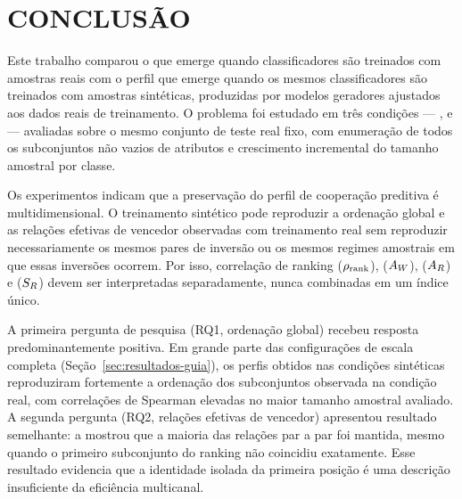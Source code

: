\chapter{CONCLUSÃO}
\label{chap:conclusao}

Este trabalho comparou o \PredictiveCooperationProfile{} que emerge quando classificadores são treinados com amostras reais com o perfil que emerge quando os mesmos classificadores são treinados com amostras sintéticas, produzidas por modelos geradores ajustados aos dados reais de treinamento. O problema foi estudado em três condições --- \RealToReal{}, \GaussianToReal{} e \GMMToReal{} --- avaliadas sobre o mesmo conjunto de teste real fixo, com enumeração de todos os subconjuntos não vazios de atributos e crescimento incremental do tamanho amostral por classe.

\begin{keyresultbox}
Os experimentos indicam que a preservação do perfil de cooperação preditiva é multidimensional. O treinamento sintético pode reproduzir a ordenação global e as relações efetivas de vencedor observadas com treinamento real sem reproduzir necessariamente os mesmos pares de inversão ou os mesmos regimes amostrais em que essas inversões ocorrem. Por isso, correlação de ranking ($\rho_{\mathrm{rank}}$), \WinnersAgreement{} ($A_W$), \ReversalExistenceAgreement{} ($A_R$) e \ReversalSampleSizeSimilarity{} ($S_R$) devem ser interpretadas separadamente, nunca combinadas em um índice único.
\end{keyresultbox}

A primeira pergunta de pesquisa (RQ1, ordenação global) recebeu resposta predominantemente positiva. Em grande parte das configurações de escala completa (Seção~\ref{sec:resultados-guia}), os perfis obtidos nas condições sintéticas reproduziram fortemente a ordenação dos subconjuntos observada na condição real, com correlações de Spearman elevadas no maior tamanho amostral avaliado. A segunda pergunta (RQ2, relações efetivas de vencedor) apresentou resultado semelhante: a \WinnersAgreement{} mostrou que a maioria das relações par a par foi mantida, mesmo quando o primeiro subconjunto do ranking não coincidiu exatamente. Esse resultado evidencia que a identidade isolada da primeira posição é uma descrição insuficiente da eficiência multicanal.

